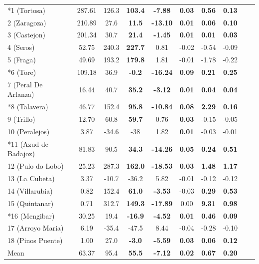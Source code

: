 \begin{table}[h]
{\begin{tabular}{lccccccccc}
        \midrule
        *1 (Tortosa)        & 287.61  & 126.3 & \textbf{103.4} & \textbf{-7.88} & \textbf{0.03}  & \textbf{0.56}  & \textbf{0.13}  \\
        2 (Zaragoza)        & 210.89  & 27.6 & \textbf{11.5}   & \textbf{-13.10}  & \textbf{0.01}  & \textbf{0.06}  & \textbf{0.10}  \\
        3 (Castejon)        & 201.34  & 30.7 & \textbf{21.4}   & \textbf{-1.45}  & \textbf{0.01}  & \textbf{0.01}  & \textbf{0.03}  \\
        4 (Seros)           & 52.75   & 240.3 & \textbf{227.7} & 0.81   & -0.02 & -0.54 & -0.09 \\
        5 (Fraga)           & 49.69   & 193.2 & \textbf{179.8} & 1.81   & -0.01 & -1.78 & -0.22 \\
        *6 (Tore)           & 109.18  & 36.9 & \textbf{-0.2}   & \textbf{-16.24} & \textbf{0.09}  & \textbf{0.21}  & \textbf{0.25}  \\
        7 (Peral De Arlanza) & 16.44  & 40.7 & \textbf{35.2}   & \textbf{-3.12}  & \textbf{0.01}  & \textbf{0.04}  & \textbf{0.04}  \\
        *8 (Talavera)       & 46.77   & 152.4 & \textbf{95.8}  & \textbf{-10.84} & \textbf{0.08}  & \textbf{2.29}  & \textbf{0.16}  \\
        9 (Trillo)          & 12.70   & 60.8 & \textbf{59.7}   & 0.76   & \textbf{0.03}  & -0.15 & -0.05 \\
        10 (Peralejos)      & 3.87    & -34.6 & -38            & 1.82   & \textbf{0.01}  & -0.03 & -0.01 \\
        *11 (Azud de Badajoz) & 81.83 & 90.5 & \textbf{34.3}   & \textbf{-14.26} & \textbf{0.05}  & \textbf{0.24}  & \textbf{0.51}  \\
        12 (Pulo do Lobo)   & 25.23   & 287.3 & \textbf{162.0} & \textbf{-18.53} & \textbf{0.03}  & \textbf{1.48}  & \textbf{1.17}  \\
        13 (La Cubeta)      & 3.37    & -10.7 & -36.2          & 5.82   & -0.01 & -0.12 & -0.12 \\
        14 (Villarubia)     & 0.82    & 152.4 & \textbf{61.0}  & \textbf{-3.53} & -0.03 & \textbf{0.29}  & \textbf{0.53}  \\
        15 (Quintanar)      & 0.71    & 312.7 & \textbf{149.3} & \textbf{-17.89} & 0.00  & \textbf{9.31}  & \textbf{0.98}  \\
        *16 (Mengibar)      & 30.25   & 19.4 & \textbf{-16.9}  & \textbf{-4.52} & \textbf{0.01}  & \textbf{0.46}  & \textbf{0.09}  \\
        17 (Arroyo Maria)   & 6.19    & -35.4 & -47.5 & 8.44   & -0.04 & -0.28 & -0.10 \\
        18 (Pinos Puente)   & 1.00    & 27.0 & \textbf{-3.0}   & \textbf{-5.59}  & \textbf{0.03}  & \textbf{0.06}  & \textbf{0.12}  \\
        \midrule
        Mean                & 63.37   & 95.4 & \textbf{55.5}   & \textbf{-7.12} & \textbf{0.02}  & \textbf{0.67}  & \textbf{0.20}  \\
        \bottomrule
    \end{tabular}
    }
    \label{table:stations_metrics}
\end{table}

